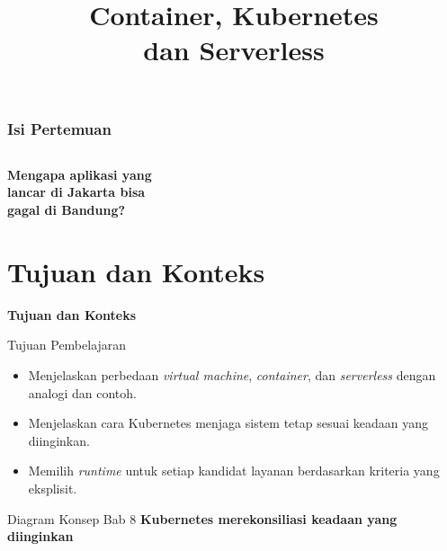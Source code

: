 \documentclass[aspectratio=169, table, 12pt]{beamer}
\title{\Huge Container, Kubernetes\\ \vspace{10pt} dan Serverless}
\begin{document}
\frame{\titlepage}

\begin{frame}
  \frametitle{Isi Pertemuan}
  \vspace{14pt}
  \begin{columns}[t]
    {\small\tableofcontents[sections={1-4}]}

    {\small\tableofcontents[sections={5-8}]}
  \end{columns}
\end{frame}

\begin{frame}{\hfill}
  \centering
  \Huge{\textbf{Mengapa aplikasi yang\\lancar di Jakarta bisa\\gagal di Bandung?}}
\end{frame}

\section{Tujuan dan Konteks}

\begin{frame}{\hfill}
  \centering
  \Huge{\textbf{Tujuan dan Konteks}}
\end{frame}

\begin{frame}{{\Large Tujuan Pembelajaran}}
  \vspace{10pt}
  \begin{itemize}
    \item Menjelaskan perbedaan \textit{virtual machine}, \textit{container},
          dan \textit{serverless} dengan analogi dan contoh.
    \item Menjelaskan cara Kubernetes menjaga sistem tetap sesuai keadaan
          yang diinginkan.
    \item Memilih \textit{runtime} untuk setiap kandidat layanan berdasarkan
          kriteria yang eksplisit.
  \end{itemize}
\end{frame}

\begin{frame}{{\Large Diagram Konsep Bab 8}}
  \centering
  {\small\bfseries Kubernetes merekonsiliasi keadaan yang diinginkan}\par\medskip
\end{frame}
\end{document}
